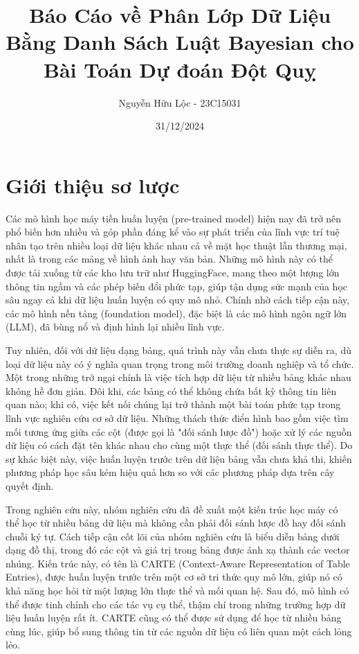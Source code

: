 \documentclass{article}
\title{Báo Cáo về Phân Lớp Dữ Liệu Bằng Danh Sách Luật Bayesian cho Bài Toán Dự đoán Đột Quỵ}
\author{Nguyễn Hữu Lộc - 23C15031}
\date{31/12/2024}
\begin{document}
\maketitle

\tableofcontents


\section{Giới thiệu sơ lược}
Các mô hình học máy tiền huấn luyện (pre-trained model) hiện nay đã trở nên phổ biến hơn nhiều và góp phần đáng kể vào sự phát triển của lĩnh vực trí tuệ nhân tạo trên nhiều loại dữ liệu khác nhau cả về mặt học thuật lẫn thương mại, nhất là trong các mảng về hình ảnh hay văn bản. Những mô hình này có thể được tải xuống từ các kho lưu trữ như HuggingFace, mang theo một lượng lớn thông tin ngầm và các phép biến đổi phức tạp, giúp tận dụng sức mạnh của học sâu ngay cả khi dữ liệu huấn luyện có quy mô nhỏ. Chính nhờ cách tiếp cận này, các mô hình nền tảng (foundation model), đặc biệt là các mô hình ngôn ngữ lớn (LLM), đã bùng nổ và định hình lại nhiều lĩnh vực.

Tuy nhiên, đối với dữ liệu dạng bảng, quá trình này vẫn chưa thực sự diễn ra, dù loại dữ liệu này có ý nghĩa quan trọng trong môi trường doanh nghiệp và tổ chức. Một trong những trở ngại chính là việc tích hợp dữ liệu từ nhiều bảng khác nhau không hề đơn giản. Đôi khi, các bảng có thể không chứa bất kỳ thông tin liên quan nào; khi có, việc kết nối chúng lại trở thành một bài toán phức tạp trong lĩnh vực nghiên cứu cơ sở dữ liệu. Những thách thức điển hình bao gồm việc tìm mối tương ứng giữa các cột (được gọi là "đối sánh lược đồ") hoặc xử lý các nguồn dữ liệu có cách đặt tên khác nhau cho cùng một thực thể (đối sánh thực thể). Do sự khác biệt này, việc huấn luyện trước trên dữ liệu bảng vẫn chưa khả thi, khiến phương pháp học sâu kém hiệu quả hơn so với các phương pháp dựa trên cây quyết định.

Trong nghiên cứu này, nhóm nghiên cứu đã đề xuất một kiến trúc học máy có thể học từ nhiều bảng dữ liệu mà không cần phải đối sánh lược đồ hay đối sánh chuỗi ký tự. Cách tiếp cận cốt lõi của nhóm nghiên cứu là biểu diễn bảng dưới dạng đồ thị, trong đó các cột và giá trị trong bảng được ánh xạ thành các vector nhúng. Kiến trúc này, có tên là CARTE (Context-Aware Representation of Table Entries), được huấn luyện trước trên một cơ sở tri thức quy mô lớn, giúp nó có khả năng học hỏi từ một lượng lớn thực thể và mối quan hệ. Sau đó, mô hình có thể được tinh chỉnh cho các tác vụ cụ thể, thậm chí trong những trường hợp dữ liệu huấn luyện rất ít. CARTE cũng có thể được sử dụng để học từ nhiều bảng cùng lúc, giúp bổ sung thông tin từ các nguồn dữ liệu có liên quan một cách lỏng lẻo.
\end{document}
